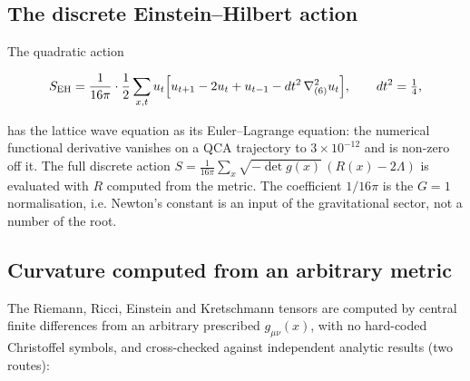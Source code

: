 \documentclass[aps,prd,amsmath,amssymb,superscriptaddress,longbibliography,floatfix,preprint]{revtex4-2}
\begin{document}
\subsection{The discrete Einstein--Hilbert action}

The quadratic action \cite{ref33}

\[S_{\rm EH} = \frac{1}{16\pi}\cdot\frac12\sum_{x,t} u_t\Big[u_{t+1} - 2u_t + u_{t-1} - dt^2\,\nabla^2_{(6)} u_t\Big],\qquad dt^2 = \tfrac14,\]

has the lattice wave equation as its Euler--Lagrange equation: the numerical functional derivative vanishes on a QCA trajectory to $3\times10^{-12}$ and is non-zero off it. The full discrete action $S = \frac{1}{16\pi}\sum_x \sqrt{-\det g(x)}\,\allowbreak{}(R(x) - 2\Lambda)$ is evaluated with $R$ computed from the metric. The coefficient $1/16\pi$ is the $G=1$ normalisation, i.e. Newton's constant is an input of the gravitational sector, not a number of the root.

\subsection{Curvature computed from an arbitrary metric}

The Riemann, Ricci, Einstein and Kretschmann tensors are computed by central finite differences from an arbitrary prescribed $g_{\mu\nu}(x)$, with no hard-coded Christoffel symbols, and cross-checked against independent analytic results (two routes):
\end{document}
